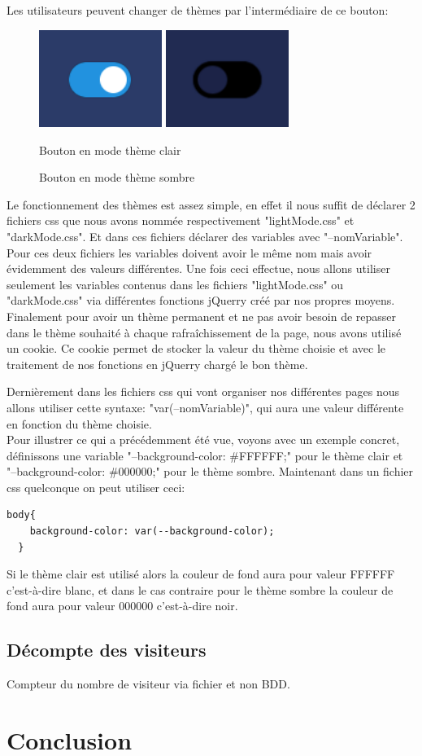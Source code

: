 \documentclass[a4paper,10pt]{article}
\begin{document}
Les utilisateurs peuvent changer de thèmes par l'intermédiaire de ce bouton:
\begin{figure}[!h]
\centerline{
    \includegraphics[width=4cm]{images/boutonThemeClaire.PNG}
    \includegraphics[width=4cm]{images/boutonThemeSombre.PNG}
}
\caption{Bouton en mode thème clair}
\caption{Bouton en mode thème sombre}
\label{fig}
\end{figure}

Le fonctionnement des thèmes est assez simple, en effet il nous suffit de déclarer 2 fichiers css que nous avons nommée respectivement "lightMode.css" et "darkMode.css". Et dans ces fichiers déclarer des variables avec "--nomVariable". Pour ces deux fichiers les variables doivent avoir le même nom mais avoir évidemment des valeurs différentes. Une fois ceci effectue, nous allons utiliser seulement les variables contenus dans les fichiers "lightMode.css" ou "darkMode.css" via différentes fonctions jQuerry créé par nos propres moyens. Finalement pour avoir un thème permanent et ne pas avoir besoin de repasser dans le thème souhaité à chaque rafraîchissement de la page, nous avons utilisé un cookie. Ce cookie permet de stocker la valeur du thème choisie et avec le traitement de nos fonctions en jQuerry chargé le bon thème.

Dernièrement dans les fichiers css qui vont organiser nos différentes pages nous allons utiliser cette syntaxe: "var(--nomVariable)", qui aura une valeur différente en fonction du thème choisie.\\

Pour illustrer ce qui a précédemment été vue, voyons avec un exemple concret, définissons une variable "--background-color: \#FFFFFF;" pour le thème clair et "--background-color: \#000000;" pour le thème sombre. Maintenant dans un fichier css quelconque on peut utiliser ceci:
\begin{lstlisting}[language=HTML]
  body{
    background-color: var(--background-color);
  }
\end{lstlisting}
Si le thème clair est utilisé alors la couleur de fond aura pour valeur FFFFFF c'est-à-dire blanc, et dans le cas contraire pour le thème sombre la couleur de fond aura pour valeur 000000 c'est-à-dire noir.

\subsection{Décompte des visiteurs}
Compteur du nombre de visiteur via fichier et non BDD.

\section{Conclusion}
\end{document}
